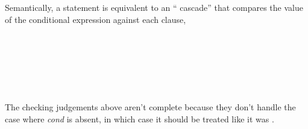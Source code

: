 \begin{Description}
Semantically, a  statement is equivalent to an `` cascade'' that compares the value of the conditional expression against each  clause,
\end{Description}



\begin{Syntax}
	 \\
		 \code{(} \\
		\SynOpt \code{;} \\
		\SynOpt \code{;} \\
		\SynOpt \code{)} \\
\end{Syntax}


\begin{Checking}
\end{Checking}

\begin{Incomplete}
The checking judgements above aren't complete because they don't handle the case where \emph{cond} is absent, in which case it should be treated like it was .
\end{Incomplete}



\begin{Syntax}
	 \\
		 \code{(}
		\SynOpt \code{)}
\end{Syntax}


